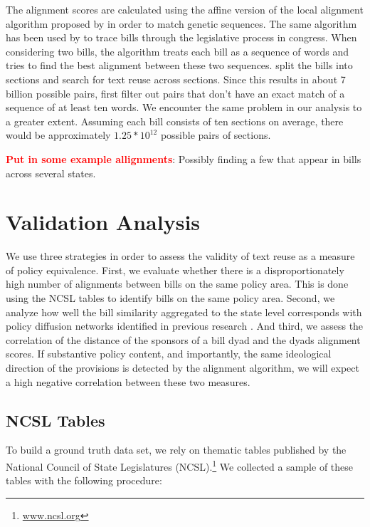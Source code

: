 \documentclass[12pt]{article} %
\begin{document}
The alignment scores are calculated using the affine version of the local alignment algorithm proposed by \citet{smith1981identification} in order to match genetic sequences. The same algorithm has been used by \citet{wilkerson2015tracing} to trace bills through the legislative process in congress. When considering two bills, the algorithm treats each bill as a sequence of words and tries to find the best alignment between these two sequences. \citet{wilkerson2015tracing} split the bills into sections and search for text reuse across sections. Since this results in about 7 billion possible pairs, first filter out pairs that don't have an exact match of a sequence of at least ten words. We encounter the same problem in our analysis to a greater extent. Assuming each bill consists of ten sections on average, there would be approximately $1.25 * 10^{12}$ possible pairs of sections. 

{\bf \textcolor{red}{Put in some example allignments}}: Possibly finding a few that appear in bills across several states.


\section{Validation Analysis}

We use three strategies in order to assess the validity of text reuse as a measure of policy equivalence. First, we evaluate whether there is a disproportionately high number of alignments between bills on the same policy area. This is done using the NCSL tables to identify bills on the same policy area.  Second, we analyze how well the bill similarity aggregated to the state level corresponds with policy diffusion networks identified in previous research \citep{desmarais2015}. And third, we assess the correlation of the distance of the sponsors of a bill dyad and the dyads alignment scores. If substantive policy content, and importantly, the same ideological direction of the provisions is detected by the alignment algorithm, we will expect a high negative correlation between these two measures.
\subsection{NCSL Tables}


To build a ground truth data set, we rely on thematic tables published by the National Council of State Legislatures (NCSL).\footnote{\url{www.ncsl.org}}  We collected a sample of these tables with the following procedure:
\end{document}
